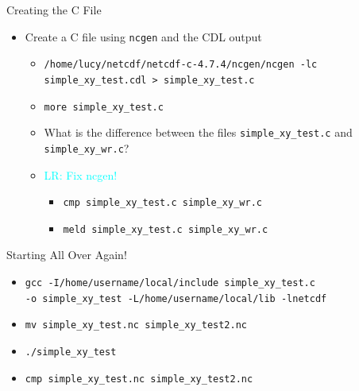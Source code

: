 \documentclass[compress,11pt,xcolor=svgnames,aspectratio=169]{beamer}
\newcommand{\lr}[1]{\textcolor{cyan}{LR: #1}}
\begin{document}
\begin{frame}[fragile]{Creating the C File}

\begin{itemize}
\setlength\itemsep{0.4cm}

  \item Create a C file using \texttt{ncgen} and the CDL output\\[0.4cm]

  \begin{itemize}
  \setlength\itemsep{0.5cm}

    \item \verb|/home/lucy/netcdf/netcdf-c-4.7.4/ncgen/ncgen -lc simple_xy_test.cdl > simple_xy_test.c|
    \item \verb|more simple_xy_test.c|
    \item What is the difference between the files \verb|simple_xy_test.c| and \verb|simple_xy_wr.c|?
    \item \lr{Fix ncgen!}

    \begin{itemize}
      \item \verb|cmp simple_xy_test.c simple_xy_wr.c|
      \item \verb|meld simple_xy_test.c simple_xy_wr.c|
    \end{itemize}

  \end{itemize}

\end{itemize}

\end{frame}

\begin{frame}[fragile]{Starting All Over Again!}

\begin{itemize}
  \setlength\itemsep{0.5cm}

  \item \verb|gcc -I/home/username/local/include simple_xy_test.c|\\
  \verb|-o simple_xy_test -L/home/username/local/lib -lnetcdf|
  \item \verb|mv simple_xy_test.nc simple_xy_test2.nc|
  \item \verb|./simple_xy_test|
  \item \verb|cmp simple_xy_test.nc simple_xy_test2.nc|

\end{itemize}

\end{frame}
\end{document}

